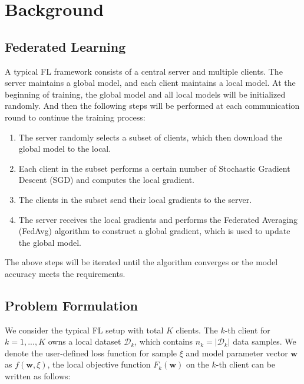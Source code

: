 \documentclass[10pt,journal,compsoc]{IEEEtran}
\newcommand{\w}{\mathbf{w}}
\newcommand{\D}{\mathcal{D}}
\begin{document}



\section{Background}
\label{background}

\subsection{Federated Learning}

A typical FL framework consists of a central server and multiple clients. The server maintains a global model, and each client maintains a local model. At the beginning of training, the global model and all local models will be initialized randomly. And then the following steps will be performed at each communication round to continue the training process\cite{konecny2017federated}:

\begin{enumerate}[1.]
\item The server randomly selects a subset of clients, which then download the global model to the local.
\item Each client in the subset performs a certain number of Stochastic Gradient Descent (SGD)\cite{stich2019local}\cite{wang2019adaptive} and computes the local gradient.
\item The clients in the subset send their local gradients to the server.
\item The server receives the local gradients and performs the Federated Averaging (FedAvg) algorithm \cite{pmlr-v54-mcmahan17a} to construct a global gradient, which is used to update the global model. 
\end{enumerate}  

The above steps will be iterated until the algorithm converges or the model accuracy meets the requirements. 

\subsection{Problem Formulation}

We consider the typical FL setup with total $K$ clients. The $k$-th client for $k = 1,...,K$ owns a local dataset $\D_k$, which contains $n_k=|\D_k|$ data samples. We denote the user-defined loss function for sample $\xi$ and model parameter vector $\w$ as $f(\w,\xi)$, the local objective function  $F_k(\w)$ on the $k$-th client can be written as follows:
\end{document}
